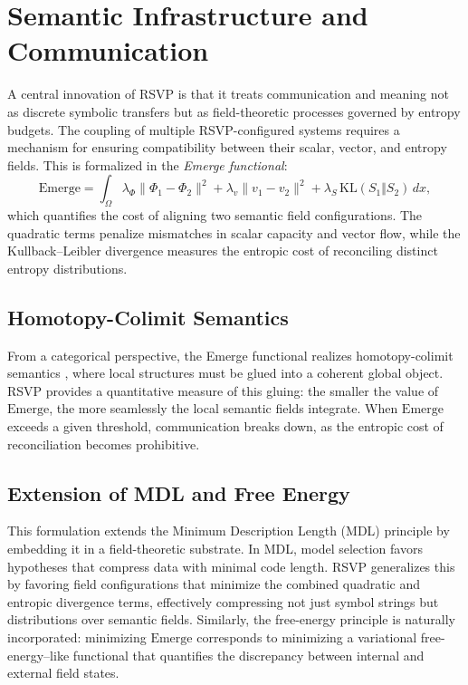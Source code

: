 \documentclass[12pt]{article}
\begin{document}
\section{Semantic Infrastructure and Communication}

A central innovation of RSVP is that it treats communication and meaning not as discrete symbolic transfers but as field-theoretic processes governed by entropy budgets. The coupling of multiple RSVP-configured systems requires a mechanism for ensuring compatibility between their scalar, vector, and entropy fields. This is formalized in the \emph{Emerge functional}:
\begin{equation}
\mathrm{Emerge} = \int_\Omega \lambda_\Phi \|\Phi_1-\Phi_2\|^2 + \lambda_v \|v_1-v_2\|^2 + \lambda_S\, \mathrm{KL}(S_1 \Vert S_2)\, dx ,
\end{equation}
which quantifies the cost of aligning two semantic field configurations. The quadratic terms penalize mismatches in scalar capacity and vector flow, while the Kullback–Leibler divergence measures the entropic cost of reconciling distinct entropy distributions.  

\subsection{Homotopy-Colimit Semantics}
From a categorical perspective, the Emerge functional realizes homotopy-colimit semantics \cite{MacLane1998,BaezStay2010}, where local structures must be glued into a coherent global object. RSVP provides a quantitative measure of this gluing: the smaller the value of $\mathrm{Emerge}$, the more seamlessly the local semantic fields integrate. When $\mathrm{Emerge}$ exceeds a given threshold, communication breaks down, as the entropic cost of reconciliation becomes prohibitive.

\subsection{Extension of MDL and Free Energy}
This formulation extends the Minimum Description Length (MDL) principle \cite{rissanen1978,Jaynes2003,Caticha2012} by embedding it in a field-theoretic substrate. In MDL, model selection favors hypotheses that compress data with minimal code length. RSVP generalizes this by favoring field configurations that minimize the combined quadratic and entropic divergence terms, effectively compressing not just symbol strings but distributions over semantic fields. Similarly, the free-energy principle \cite{Friston:2009ze} is naturally incorporated: minimizing $\mathrm{Emerge}$ corresponds to minimizing a variational free-energy–like functional that quantifies the discrepancy between internal and external field states.
\end{document}
